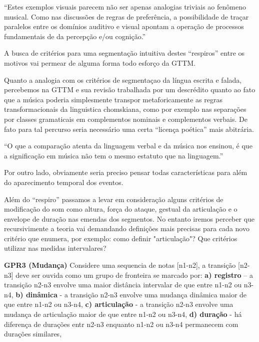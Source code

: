 \documentclass[
	12pt,				%
	openright,			%
	twoside,			%
	a4paper,			%
	english,			%
	french,				%
	spanish,			%
	brazil				%
	]{abntex2}
\begin{document}
\begin{citacao}
“Estes exemplos visuais parecem não ser apenas analogias triviais ao fenômeno musical. Como nas discussões de regras de preferência, a possibilidade de traçar paralelos entre os domínios auditivo e visual apontam a operação de processos fundamentais de da percepção e/ou cognição.” \cite{lerdahl1983generative} 
\end{citacao}

A busca de critérios para uma segmentação intuitiva destes “respiros” entre os motivos vai permear de alguma forma todo esforço da GTTM. 

Quanto a analogia com os critérios de segmentaçao da língua escrita e falada, percebemos na GTTM e sua revisão trabalhada por  um descrédito quanto ao fato que a música poderia simplesmente transpor metaforicamente as regras transformacionais da linguistica chomskiana, como por exemplo nas separações por classes gramaticais em complementos nominais e complementos verbais.  De fato para tal percurso seria necessário uma certa “licença poética” mais abitrária.

\begin{citacao}
“O que a comparação atenta da linguagem verbal e da música nos ensinou, é que a significação em música não tem o mesmo estatuto que na linguagem.”\cite[ p.9]{nattiez2004modelos}
\end{citacao}

Por outro lado, obviamente seria preciso pensar todas características para além do aparecimento temporal dos eventos.

Além do “respiro” passamos a levar em consideração alguns critérios de modificação do som como altura, força do ataque, gestual da articulação e o envelope de duração nas emendas dos segmentos. No entanto iremos perceber que recursivimente a teoria vai demandando definições mais precisas para cada novo critério que enumera, por exemplo: como definir "articulação"? Que critérios utilizar nas medidas intervalares?


\begin{citacao}
\textbf{GPR3 (Mudança)} Considere uma sequencia de notas [n1-n2], a transição [n2-n3] deve ser ouvida como um grupo de fronteira se marcado por: \textbf{a) registro} – a transição n2-n3 envolve uma maior distância intervalar de que entre n1-n2 ou n3-n4, \textbf{b) dinâmica} - a transição n2-n3 envolve uma mudança dinâmica maior de que entre n1-n2 ou n3-n4, \textbf{c) articulação} - a transição n2-n3 envolve uma mudança de articulação maior de que entre n1-n2 ou n3-n4, \textbf{d) duração} - há diferença de durações  entr n2-n3 enquanto n1-n2 ou n3-n4 permanecem com durações similares,
\cite{lerdahl1983generative}
\end{citacao}
\end{document}
